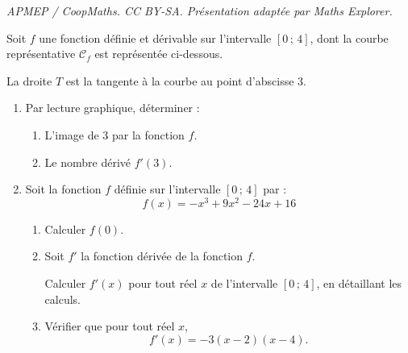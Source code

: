 \documentclass[10pt]{article}
\begin{document}
\noindent\textit{APMEP / CoopMaths. CC BY-SA. Présentation adaptée par Maths Explorer.}\par\medskip
Soit $f$ une fonction définie et dérivable sur l'intervalle $[0\,;\,4]$, dont la courbe représentative $\mathcal{C}_f$ est représentée ci-dessous.

La droite $T$ est la tangente à la courbe au point d'abscisse 3.

\begin{minipage}{0.60\textwidth}
\begin{enumerate}
\item Par lecture graphique, déterminer :
\begin{enumerate}
\item L'image de 3 par la fonction $f$.
\item Le nombre dérivé $f'(3)$.
\end{enumerate}
\item Soit la fonction $f$ définie sur l'intervalle $[0\,;\,4]$ par :
\[
f(x)=-x^3+9x^2-24x+16
\]
\begin{enumerate}
\item Calculer $f(0)$.
\item Soit $f'$ la fonction dérivée de la fonction $f$.

Calculer $f'(x)$ pour tout réel $x$ de l'intervalle $[0\,;\,4]$, en détaillant les calculs.

\item Vérifier que pour tout réel $x$,
\[f'(x)=-3(x-2)(x-4).\]
\end{enumerate}
\end{enumerate}
\end{minipage}
\hfill
\begin{minipage}{0.40\textwidth}
\begin{center}
\end{center}
\end{minipage}
\end{document}
